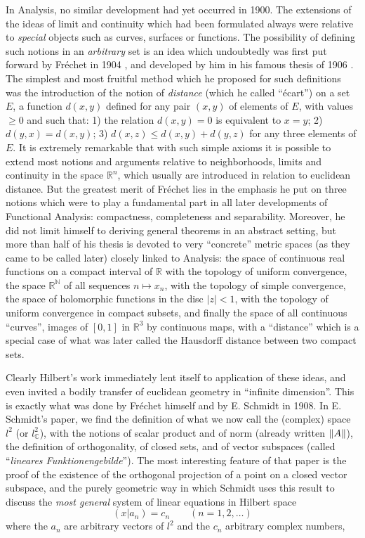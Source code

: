 \documentclass[12pt,a4paper,leqno,twoside]{extbook}
\DeclarePairedDelimiter{\norm}{\lVert}{\rVert}
\newcommand{\C}{\mathbb{C}}
\newcommand{\R}{\mathbb{R}}
\begin{document}
In Analysis, no similar development had yet occurred in 1900. The extensions of the ideas of limit and continuity which had been formulated always were relative to \emph{special} objects such as curves, surfaces or functions. The possibility of defining such notions in an \emph{arbitrary} set is an idea which undoubtedly was first put forward by Fréchet in 1904 \cite{069}, and developed by him in his famous thesis of 1906 \cite{071}. The simplest and most fruitful method which he proposed for such definitions was the introduction of the notion of \emph{distance} (which he called ``écart'') on a set \(E\), a function \(d(x,y)\) defined for any pair \((x,y)\) of elements of \(E\), with values \(\geq 0\) and such that: 1) the relation \(d(x,y) = 0\) is equivalent to \(x = y\); 2) \(d(y,x) = d(x,y)\); 3) \(d(x,z) \leq d(x,y) + d(y,z)\) for any three elements of \(E\). It is extremely remarkable that with such simple axioms it is possible to extend most notions and arguments relative to neighborhoods, limits and continuity in the space \(\R^n\), which usually are introduced in relation to euclidean distance. But the greatest merit of Fréchet lies in the emphasis he put on three notions which were to play a fundamental part in all later developments of Functional Analysis: compactness, completeness and separability. Moreover, he did not limit himself to deriving general theorems in an abstract setting, but more than half of his thesis is devoted to very ``concrete'' metric spaces (as they came to be called later) closely linked to Analysis: the space of continuous real functions on a compact interval of \(\R\) with the topology of uniform convergence, the space \(\R^{\mathbb{N}}\) of all sequences \(n \mapsto x_n\), with the topology of simple convergence, the space of holomorphic functions in the disc \(|z| < 1\), with the topology of uniform convergence in compact subsets, and finally the space of all continuous ``curves'', images of \([0,1]\) in \(\R^3\) by continuous maps, with a ``distance'' which is a special case of what was later called the Hausdorff distance between two compact sets.

Clearly Hilbert's work immediately lent itself to application of these ideas, and even invited a bodily transfer of euclidean geometry in ``infinite dimension''. This is exactly what was done by Fréchet himself \cite{072} and by E. Schmidt \cite{192} in 1908. In E. Schmidt's paper, we find the definition of what we now call the (complex) space \(l^2\) (or \(l^2_{\C}\)), with the notions of scalar product and of norm (already written \(\norm{A}\)), the definition of orthogonality, of closed sets, and of vector subspaces (called ``\emph{lineares Funktionengebilde}''). The most interesting feature of that paper is the proof of the existence of the orthogonal projection of a point on a closed vector subspace, and the purely geometric way in which Schmidt uses this result to discuss the \emph{most general} system of linear equations in Hilbert space
\begin{equation}
    \label{eq:5.42}
    (x|a_n) = c_n \qquad (n=1,2,\ldots)
\end{equation}
where the \(a_n\) are arbitrary vectors of \(l^2\) and the \(c_n\) arbitrary complex numbers,
\end{document}
